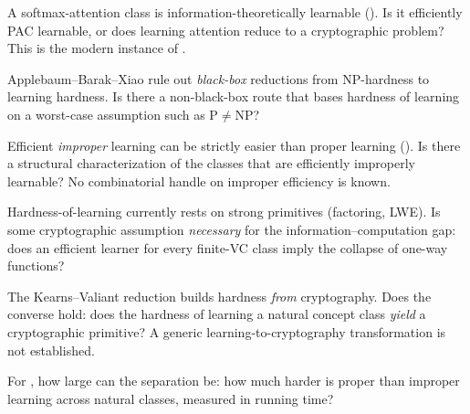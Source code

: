 \begin{openprob}
\label{op:attention-efficient}
A softmax-attention class is information-theoretically learnable
().  Is it efficiently PAC learnable, or
does learning attention reduce to a cryptographic problem?  This is the modern
instance of .
\end{openprob}

\begin{openprob}
\label{op:worst-to-average}
Applebaum--Barak--Xiao rule out \emph{black-box} reductions from
$\mathrm{NP}$-hardness to learning hardness.  Is there a non-black-box route
that bases hardness of learning on a worst-case assumption such as
$\mathrm{P} \neq \mathrm{NP}$?~\cite{ApplebaumBarakXiao2008}
\end{openprob}

\begin{openprob}
\label{op:improper-characterization}
Efficient \emph{improper} learning can be strictly easier than proper learning
().  Is there a structural characterization of the
classes that are efficiently improperly learnable?  No combinatorial handle on
improper efficiency is known.
\end{openprob}

\begin{openprob}
\label{op:minimal-assumption}
Hardness-of-learning currently rests on strong primitives (factoring, LWE).
Is some cryptographic assumption \emph{necessary} for the
information--computation gap: does an efficient learner for every finite-VC
class imply the collapse of one-way functions?~\cite{Daniely2021}
\end{openprob}

\begin{openprob}
\label{op:learning-to-crypto}
The Kearns--Valiant reduction builds hardness \emph{from} cryptography. Does
the converse hold: does the hardness of learning a natural concept class
\emph{yield} a cryptographic primitive?  A generic learning-to-cryptography
transformation is not established.
\end{openprob}

\begin{openprob}
\label{op:proper-improper-size}
For , how large can the separation be: how much
harder is proper than improper learning across natural classes, measured in
running time?~\cite{PittValiant1988}
\end{openprob}

